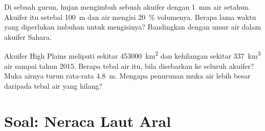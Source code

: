 \begin{exercise}[$\star\star\star$]\label{exo:g10:freshwater-resources:14}
Di sebuah gurun, hujan mengimbuh sebuah akuifer dengan \qty{1}{mm} air
setahun. Akuifer itu setebal \qty{100}{m} dan air mengisi \qty{20}{\percent}
volumenya. Berapa lama waktu yang diperlukan imbuhan untuk mengisinya?
Bandingkan dengan umur air dalam akuifer Sahara.
\end{exercise}

\begin{exercise}[$\star\star\star$]\label{exo:g10:freshwater-resources:15}
Akuifer High Plains meliputi sekitar \qty{453000}{km^2} dan kehilangan
sekitar \qty{337}{km^3} air sampai tahun 2015. Berapa tebal air itu, bila
disebarkan ke seluruh akuifer? Muka airnya turun rata-rata \qty{4.8}{m}.
Mengapa penurunan muka air lebih besar daripada tebal air yang hilang?
\end{exercise}

\section{Soal: Neraca Laut Aral}

